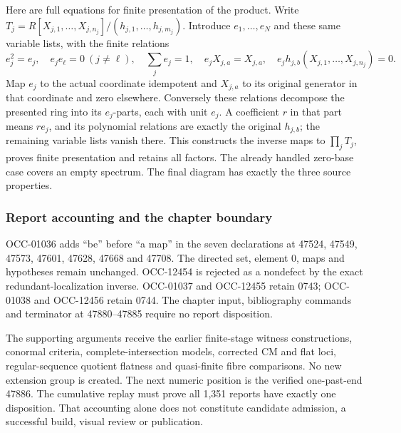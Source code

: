 Here are full equations for finite presentation of the product. Write \(T_j=R[X_{j,1},\ldots,X_{j,n_j}]/(h_{j,1},\ldots,h_{j,m_j})\). Introduce \(e_1,\ldots,e_N\) and these same variable lists, with the finite relations \[
e_j^2=e_j,\quad e_je_\ell=0\ (j\ne\ell),\quad
\sum_j e_j=1,\quad e_jX_{j,a}=X_{j,a},\quad
e_jh_{j,b}(X_{j,1},\ldots,X_{j,n_j})=0.
\] Map \(e_j\) to the actual coordinate idempotent and \(X_{j,a}\) to its original generator in that coordinate and zero elsewhere. Conversely these relations decompose the presented ring into its \(e_j\)-parts, each with unit \(e_j\). A coefficient \(r\) in that part means \(re_j\), and its polynomial relations are exactly the original \(h_{j,b}\); the remaining variable lists vanish there. This constructs the inverse maps to \(\prod_jT_j\), proves finite presentation and retains all factors. The already handled zero-base case covers an empty spectrum. The final diagram has exactly the three source properties.

\subsubsection{Report accounting and the chapter boundary}\label{algebra-proof-073-report-accounting-and-the-chapter-boundary}

OCC-01036 adds ``be'' before ``a map'' in the seven declarations at 47524, 47549, 47573, 47601, 47628, 47668 and 47708. The directed set, element \(0\), maps and hypotheses remain unchanged. OCC-12454 is rejected as a nondefect by the exact redundant-localization inverse. OCC-01037 and OCC-12455 retain 0743; OCC-01038 and OCC-12456 retain 0744. The chapter input, bibliography commands and terminator at 47880--47885 require no report disposition.

The supporting arguments receive the earlier finite-stage witness constructions, conormal criteria, complete-intersection models, corrected CM and flat loci, regular-sequence quotient flatness and quasi-finite fibre comparisons. No new extension group is created. The next numeric position is the verified one-past-end 47886. The cumulative replay must prove all 1,351 reports have exactly one disposition. That accounting alone does not constitute candidate admission, a successful build, visual review or publication.
